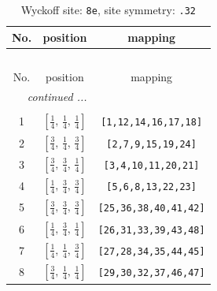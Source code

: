 \documentclass[fleqn,8pt]{jsarticle}
\begin{document}
\begin{longtable}{ccc}
\caption{Wyckoff site: {\tt 8e}, site symmetry: {\tt .32}}
 \\
 \hline \hline
No. & position & mapping \\ \hline \endfirsthead

\multicolumn{2}{l}{\tablename\ \thetable{}} \\
 \hline \hline
No. & position & mapping \\ \hline \endhead

 \hline \hline
\multicolumn{2}{r}{\footnotesize\it continued ...} \\ \endfoot

 \hline \hline
\multicolumn{2}{r}{} \\ \endlastfoot

1 & $\left[ \frac{1}{4},\, \frac{1}{4},\, \frac{1}{4} \right]$ & {\tt [1,12,14,16,17,18]} \\ \hline
2 & $\left[ \frac{3}{4},\, \frac{1}{4},\, \frac{3}{4} \right]$ & {\tt [2,7,9,15,19,24]} \\ \hline
3 & $\left[ \frac{3}{4},\, \frac{3}{4},\, \frac{1}{4} \right]$ & {\tt [3,4,10,11,20,21]} \\ \hline
4 & $\left[ \frac{1}{4},\, \frac{3}{4},\, \frac{3}{4} \right]$ & {\tt [5,6,8,13,22,23]} \\ \hline
5 & $\left[ \frac{3}{4},\, \frac{3}{4},\, \frac{3}{4} \right]$ & {\tt [25,36,38,40,41,42]} \\ \hline
6 & $\left[ \frac{1}{4},\, \frac{3}{4},\, \frac{1}{4} \right]$ & {\tt [26,31,33,39,43,48]} \\ \hline
7 & $\left[ \frac{1}{4},\, \frac{1}{4},\, \frac{3}{4} \right]$ & {\tt [27,28,34,35,44,45]} \\ \hline
8 & $\left[ \frac{3}{4},\, \frac{1}{4},\, \frac{1}{4} \right]$ & {\tt [29,30,32,37,46,47]} \\
\end{longtable}
\renewcommand{\arraystretch}{1.2}
\end{document}
